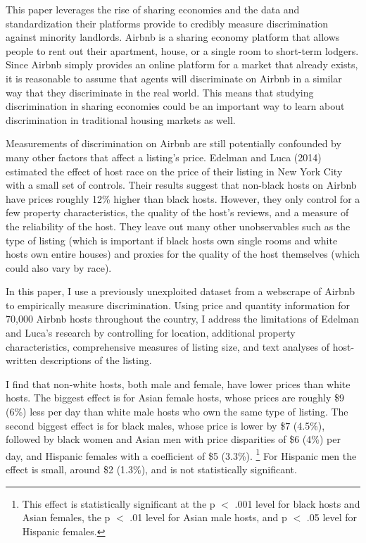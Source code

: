 This paper leverages the rise of sharing economies and the data and standardization their platforms provide to credibly measure discrimination against minority landlords. Airbnb is a sharing economy platform that allows people to rent out their apartment, house, or a single room to short-term lodgers. Since Airbnb simply provides an online platform for a market that already exists, it is reasonable to assume that agents will discriminate on Airbnb in a similar way that they discriminate in the real world. This means that studying discrimination in sharing economies could be an important way to learn about discrimination in traditional housing markets as well.

Measurements of discrimination on Airbnb are still potentially confounded by many other factors that affect a listing's price. Edelman and Luca (2014) estimated the effect of host race on the price of their listing in New York City with a small set of controls. Their results suggest that non-black hosts on Airbnb have prices roughly 12\% higher than black hosts. However, they only control for a few property characteristics, the quality of the host's reviews, and a measure of the reliability of the host. They leave out many other unobservables such as the type of listing (which is important if black hosts own single rooms and white hosts own entire houses) and proxies for the quality of the host themselves (which could also vary by race). 

In this paper, I use a previously unexploited dataset from a webscrape of Airbnb to empirically measure discrimination. Using price and quantity information for 70,000 Airbnb hosts throughout the country, I address the limitations of Edelman and Luca's research by controlling for location, additional property characteristics, comprehensive measures of listing size, and text analyses of host-written descriptions of the listing. 

I find that non-white hosts, both male and female, have lower prices than white hosts. The biggest effect is for Asian female hosts, whose prices are roughly \$9 (6\%) less per day than white male hosts who own the same type of listing. The second biggest effect is for black males, whose price is lower by \$7 (4.5\%), followed by black women and Asian men with price disparities of \$6 (4\%) per day, and Hispanic females with a coefficient of \$5 (3.3\%).%
	\footnote{This effect is statistically significant at the p $<$ .001 level for black hosts and Asian females, the p $<$ .01 level for Asian male hosts, and p $<$ .05 level for Hispanic females.} 
For Hispanic men the effect is small, around \$2 (1.3\%), and is not statistically significant. 

